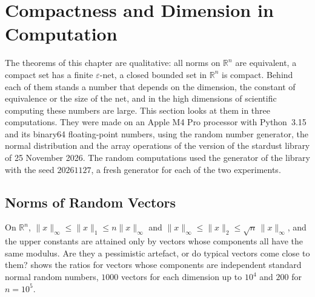 \section{Compactness and Dimension in Computation}
\label{sec:compact-computation}

The theorems of this chapter are qualitative: all norms on $\mathbb R^n$ are equivalent, a compact set has a finite $\varepsilon$-net, a closed bounded set in $\mathbb R^n$ is compact. Behind each of them stands a number that depends on the dimension, the constant of equivalence or the size of the net, and in the high dimensions of scientific computing these numbers are large. This section looks at them in three computations. They were made on an Apple M4 Pro processor with Python~3.15 and its binary64 floating-point numbers, using the random number generator, the normal distribution and the array operations of the version of the stardust library of 25 November 2026. The random computations used the generator of the library with the seed $20261127$, a fresh generator for each of the two experiments.

\subsection{Norms of Random Vectors}

On $\mathbb R^n$, $\|x\|_\infty\le\|x\|_1\le n\|x\|_\infty$ and $\|x\|_\infty\le\|x\|_2\le\sqrt n\,\|x\|_\infty$, and the upper constants are attained only by vectors whose components all have the same modulus. Are they a pessimistic artefact, or do typical vectors come close to them?  shows the ratios for vectors whose components are independent standard normal random numbers, $1000$ vectors for each dimension up to $10^4$ and $200$ for $n=10^5$.

\begin{table}
\end{table}

